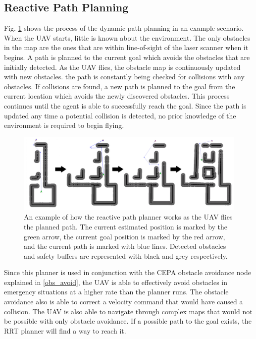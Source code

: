 \documentclass[letterpaper, 10 pt, conference]{ieeeconf}  %
\begin{document}
\subsection{Reactive Path Planning}

Fig. \ref{fig:reactive_plan} shows the process of the dynamic path planning in an example scenario. When the UAV starts, little is known about the environment. The only obstacles in the map are the ones that are within line-of-sight of the laser scanner when it begins. A path is planned to the current goal which avoids the obstacles that are initially detected. As the UAV flies, the obstacle map is continuously updated with new obstacles. the path is constantly being checked for collisions with any obstacles. If collisions are found, a new path is planned to the goal from the current location which avoids the newly discovered obstacles. This process continues until the agent is able to successfully reach the goal. Since the path is updated any time a potential collision is detected, no prior knowledge of the environment is required to begin flying.

\begin{figure}
\centering
\includegraphics[width=1.0\linewidth]{adaptive_path_plan2.png}
\caption{An example of how the reactive path planner works as the UAV flies the planned path. The current estimated position is marked by the green arrow, the current goal position is marked by the red arrow, and the current path is marked with blue lines. Detected obstacles and safety buffers are represented with black and grey respectively.}
\label{fig:reactive_plan}
\end{figure}

Since this planner is used in conjunction with the CEPA obstacle avoidance node explained in \ref{obs_avoid}, the UAV is able to effectively avoid obstacles in emergency situations at a higher rate than the planner runs. The obstacle avoidance also is able to correct a velocity command that would have caused a collision. The UAV is also able to navigate through complex maps that would not be possible with only obstacle avoidance. If a possible path to the goal exists, the RRT planner will find a way to reach it.
\end{document}
